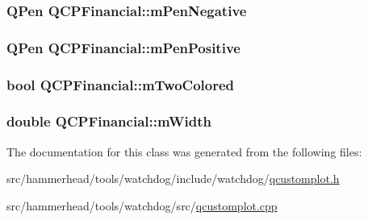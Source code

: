 \subsubsection[{\texorpdfstring{m\+Pen\+Negative}{mPenNegative}}]{\setlength{\rightskip}{0pt plus 5cm}Q\+Pen Q\+C\+P\+Financial\+::m\+Pen\+Negative\hspace{0.3cm}{\ttfamily [protected]}}\hypertarget{classQCPFinancial_a263fbfefde2cc19c8d4024a8319c2bbb}{}\label{classQCPFinancial_a263fbfefde2cc19c8d4024a8319c2bbb}
\subsubsection[{\texorpdfstring{m\+Pen\+Positive}{mPenPositive}}]{\setlength{\rightskip}{0pt plus 5cm}Q\+Pen Q\+C\+P\+Financial\+::m\+Pen\+Positive\hspace{0.3cm}{\ttfamily [protected]}}\hypertarget{classQCPFinancial_aa6599186f417ba615caebb3f6c762bd8}{}\label{classQCPFinancial_aa6599186f417ba615caebb3f6c762bd8}
\subsubsection[{\texorpdfstring{m\+Two\+Colored}{mTwoColored}}]{\setlength{\rightskip}{0pt plus 5cm}bool Q\+C\+P\+Financial\+::m\+Two\+Colored\hspace{0.3cm}{\ttfamily [protected]}}\hypertarget{classQCPFinancial_a6afe919190b884d9bac026cefcc8c0a8}{}\label{classQCPFinancial_a6afe919190b884d9bac026cefcc8c0a8}
\subsubsection[{\texorpdfstring{m\+Width}{mWidth}}]{\setlength{\rightskip}{0pt plus 5cm}double Q\+C\+P\+Financial\+::m\+Width\hspace{0.3cm}{\ttfamily [protected]}}\hypertarget{classQCPFinancial_af630e5eb8485146b9c777e63fd1cf993}{}\label{classQCPFinancial_af630e5eb8485146b9c777e63fd1cf993}


The documentation for this class was generated from the following files\+:\begin{DoxyCompactItemize}
\item 
src/hammerhead/tools/watchdog/include/watchdog/\hyperlink{qcustomplot_8h}{qcustomplot.\+h}\item 
src/hammerhead/tools/watchdog/src/\hyperlink{qcustomplot_8cpp}{qcustomplot.\+cpp}\end{DoxyCompactItemize}
